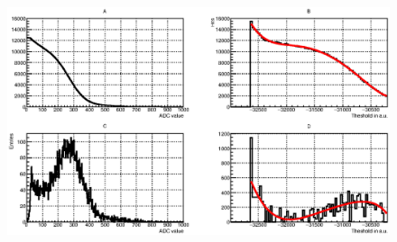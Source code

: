 \begin{figure}
\includegraphics[width=1.0\textwidth]{pictures/32_Blackboard_18jan.eps}
\caption{}
\label{fig:Blackboard}
\end{figure}
